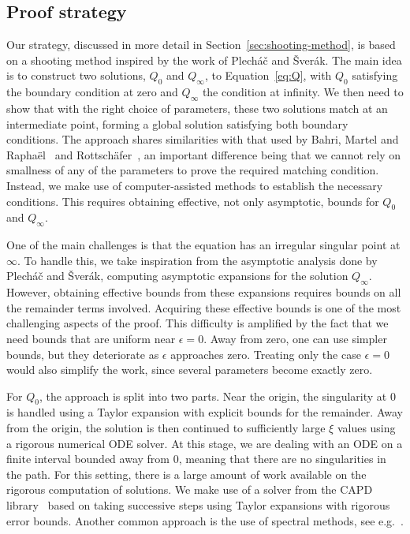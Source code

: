 \documentclass[11pt]{article}
\begin{document}
\subsection{Proof strategy}
\label{sec:proof-strategy}

Our strategy, discussed in more detail in
Section~\ref{sec:shooting-method}, is based on a shooting method
inspired by the work of Plecháč and Šverák. The main idea is to
construct two solutions, \(Q_{0}\) and \(Q_{\infty}\), to
Equation~\eqref{eq:Q}, with \(Q_{0}\) satisfying the boundary
condition at zero and \(Q_{\infty}\) the condition at infinity. We
then need to show that with the right choice of parameters, these two
solutions match at an intermediate point, forming a global solution
satisfying both boundary conditions. The approach shares similarities
with that used by Bahri, Martel and Raphaël~\cite{Bahri2021} and
Rottschäfer~\cite{Rottshafer2013}, an important difference being that
we cannot rely on smallness of any of the parameters to prove the
required matching condition. Instead, we make use of computer-assisted
methods to establish the necessary conditions. This requires obtaining
effective, not only asymptotic, bounds for \(Q_{0}\) and
\(Q_{\infty}\).

One of the main challenges is that the equation has an irregular
singular point at \(\infty\). To handle this, we take inspiration from
the asymptotic analysis done by Plecháč and Šverák, computing
asymptotic expansions for the solution \(Q_{\infty}\). However,
obtaining effective bounds from these expansions requires bounds on
all the remainder terms involved. Acquiring these effective bounds is
one of the most challenging aspects of the proof. This difficulty is
amplified by the fact that we need bounds that are uniform near
\(\epsilon = 0\). Away from zero, one can use simpler bounds, but they
deteriorate as \(\epsilon\) approaches zero. Treating only the case
\(\epsilon = 0\) would also simplify the work, since several
parameters become exactly zero.

For \(Q_{0}\), the approach is split into two parts. Near the origin,
the singularity at \(0\) is handled using a Taylor expansion with
explicit bounds for the remainder. Away from the origin, the solution
is then continued to sufficiently large \(\xi\) values using a
rigorous numerical ODE solver. At this stage, we are dealing with an
ODE on a finite interval bounded away from \(0\), meaning that there
are no singularities in the path. For this setting, there is a large
amount of work available on the rigorous computation of solutions. We
make use of a solver from the CAPD library~\cite{Kapela2021} based on
taking successive steps using Taylor expansions with rigorous error
bounds. Another common approach is the use of spectral methods, see
e.g.~\cite{Lessard2014, Hungria2015, vandenBerg2021, Breden2026}.
\end{document}
